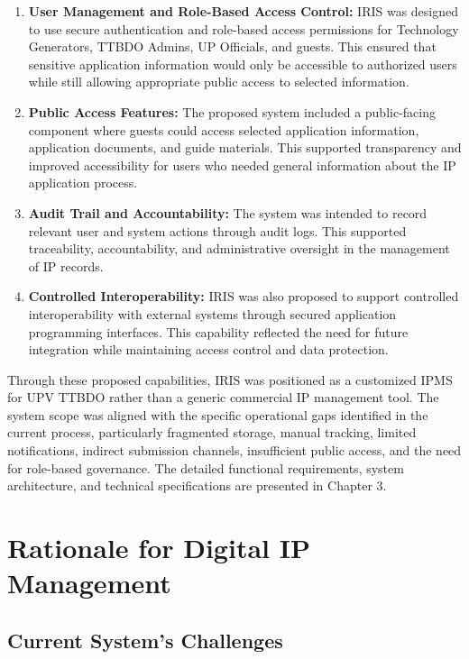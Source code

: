 \begin{enumerate}
   \item \textbf{User Management and Role-Based Access Control:} IRIS was designed to use secure authentication and role-based access permissions for Technology Generators, TTBDO Admins, UP Officials, and guests. This ensured that sensitive application information would only be accessible to authorized users while still allowing appropriate public access to selected information.
   \item \textbf{Public Access Features:} The proposed system included a public-facing component where guests could access selected application information, application documents, and guide materials. This supported transparency and improved accessibility for users who needed general information about the IP application process.
   \item \textbf{Audit Trail and Accountability:} The system was intended to record relevant user and system actions through audit logs. This supported traceability, accountability, and administrative oversight in the management of IP records.
   \item \textbf{Controlled Interoperability:} IRIS was also proposed to support controlled interoperability with external systems through secured application programming interfaces. This capability reflected the need for future integration while maintaining access control and data protection.
\end{enumerate}

Through these proposed capabilities, IRIS was positioned as a customized IPMS for UPV TTBDO rather than a generic commercial IP management tool. The system scope was aligned with the specific operational gaps identified in the current process, particularly fragmented storage, manual tracking, limited notifications, indirect submission channels, insufficient public access, and the need for role-based governance. The detailed functional requirements, system architecture, and technical specifications are presented in Chapter 3.

\section[Rationale for Digital IP Management]{Rationale for Digital IP Management}

\subsection{Current System’s Challenges}

